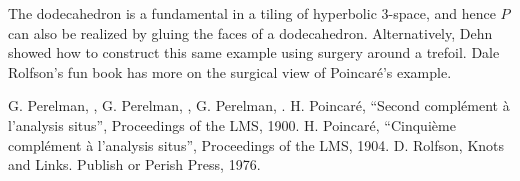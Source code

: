 \documentclass[12pt]{article}
\begin{document}
The dodecahedron is a fundamental  in a tiling of hyperbolic 3-space, and hence $P$ can also be realized by gluing the  faces of a  dodecahedron.  Alternatively, Dehn showed how to construct this same example using surgery around a trefoil.  
Dale Rolfson's fun book  \cite{rolfson1976} has more on the surgical view of Poincar\'e's example.

\begin{thebibliography}{9900000000}
  G. Perelman, 
,
  G. Perelman, 
,
  G. Perelman, .
 H. Poincar\'e, ``Second compl\'ement \`a l'analysis situs'', Proceedings of the LMS, 1900.
  H. Poincar\'e, ``Cinqui\`eme compl\'ement \`a l'analysis situs'', Proceedings of the LMS, 1904.
  D. Rolfson, Knots and Links.  Publish or Perish Press, 1976.
\end{thebibliography}
\end{document}
